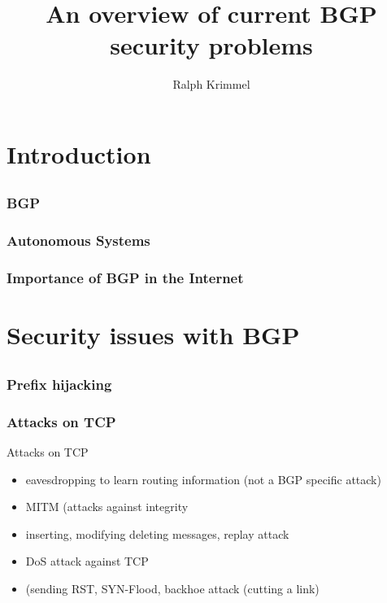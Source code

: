 \documentclass[notes=hide,yellow]{beamer}
\title{An overview of current BGP security problems}
\subtitle{ }
\author{Ralph Krimmel}
\begin{document}
	\begin{frame}
		\titlepage
	\end{frame}

	\begin{frame}
		\tableofcontents
	\end{frame}

\section{ Introduction}
\subsection*{}
\begin{frame}
	\frametitle{BGP}
\end{frame}

\begin{frame}
	\frametitle{Autonomous Systems}

\end{frame}

\begin{frame}
	\frametitle{Importance of BGP in the Internet}
\end{frame}

\section{Security issues with BGP}
\subsection*{}
\begin{frame}
	\frametitle{Prefix hijacking}
\end{frame}

\begin{frame}
	\frametitle{Attacks on TCP}
	
	\begin{block}{Attacks on TCP}
	\begin{itemize}
		\item eavesdropping to learn routing information (not a BGP specific attack)
		\item MITM (attacks against integrity
		\item inserting, modifying deleting messages, replay attack
		\item DoS attack against TCP
		\item (sending RST, SYN-Flood, backhoe attack (cutting a link)
	\end{itemize}
	\end{block}

\end{frame}
\end{document}
